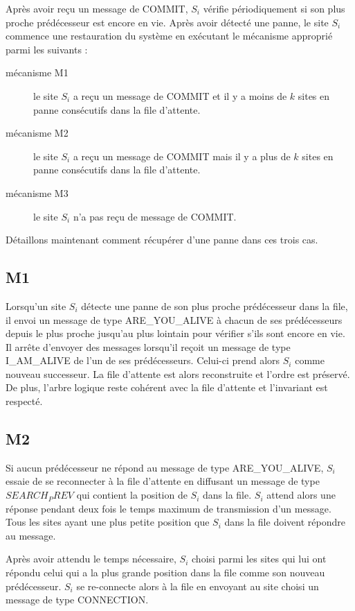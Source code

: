 Après avoir reçu un message de COMMIT, $S_i$ vérifie périodiquement si son plus proche prédécesseur est encore en vie. Après avoir détecté une panne, le site $S_i$ commence une restauration du système en exécutant le mécanisme approprié parmi les suivants :
\begin{description}
\item[mécanisme M1] le site $S_i$ a reçu un message de COMMIT et il y a moins de $k$ sites en panne consécutifs dans la file d'attente.
\item[mécanisme M2] le site $S_i$ a reçu un message de COMMIT mais il y a plus de $k$ sites en panne consécutifs dans la file d'attente.
\item[mécanisme M3] le site $S_i$ n'a pas reçu de message de COMMIT.
\end{description}
Détaillons maintenant comment récupérer d'une panne dans ces trois cas.

\subsection{M1}
Lorsqu'un site $S_i$ détecte une panne de son plus proche prédécesseur dans la file, il envoi un message de type ARE\_YOU\_ALIVE à chacun de ses prédécesseurs depuis le plus proche jusqu'au plus lointain pour vérifier s'ils sont encore en vie.
Il arrête d'envoyer des messages lorsqu'il reçoit un message de type I\_AM\_ALIVE de l'un de ses prédécesseurs. Celui-ci prend alors $S_i$ comme nouveau successeur. La file d'attente est alors reconstruite et l'ordre est préservé. De plus, l'arbre logique reste cohérent avec la file d'attente et l'invariant est respecté.

\subsection{M2}
Si aucun prédécesseur ne répond au message de type ARE\_YOU\_ALIVE, $S_i$ essaie de se reconnecter à la file d'attente en diffusant un message de type $SEARCH_PREV$ qui contient la position de $S_i$ dans la file. $S_i$ attend alors une réponse pendant deux fois le temps maximum de transmission d'un message. Tous les sites ayant une plus petite position que $S_i$ dans la file doivent répondre au message.

Après avoir attendu le temps nécessaire, $S_i$ choisi parmi les sites qui lui ont répondu celui qui a la plus grande position dans la file comme son nouveau prédécesseur. $S_i$ se re-connecte alors à la file en envoyant au site choisi un message de type CONNECTION.


